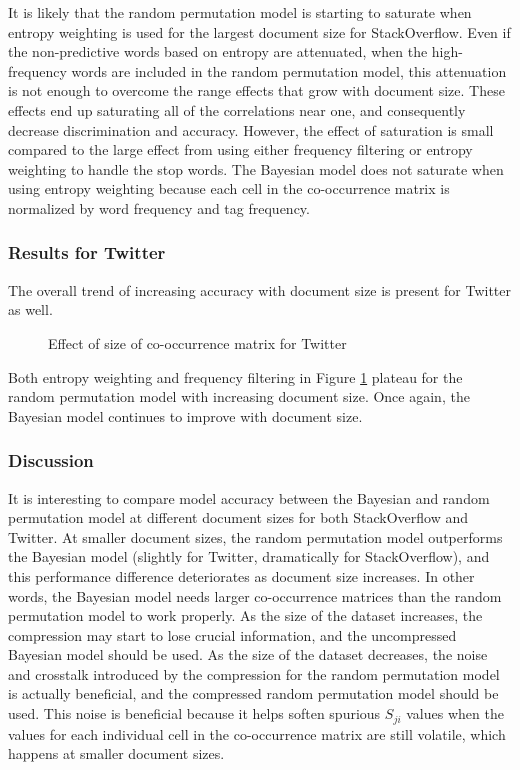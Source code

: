 \documentclass[man,floatsintext,donotrepeattitle]{apa6}
\begin{document}
It is likely that the random permutation model is starting to saturate when entropy weighting is used for the largest document size for StackOverflow.
Even if the non-predictive words based on entropy are attenuated,
when the high-frequency words are included in the random permutation model,
this attenuation is not enough to overcome the range effects that grow with document size.
These effects end up saturating all of the correlations near one, and consequently decrease discrimination and accuracy.
However, the effect of saturation is small compared to the large effect from using either frequency filtering or entropy weighting to handle the stop words.
The Bayesian model does not saturate when using entropy weighting because each cell in the co-occurrence matrix is normalized by word frequency and tag frequency.

\subsubsection{Results for Twitter}

The overall trend of increasing accuracy with document size is present for Twitter as well.

\begin{figure}[!htbp]
  \caption{Effect of size of co-occurrence matrix for Twitter}
  \label{figContextDocumentSizeT}
\end{figure}

Both entropy weighting and frequency filtering in Figure \ref{figContextDocumentSizeT} plateau for the random permutation model with increasing document size.
Once again, the Bayesian model continues to improve with document size.

\subsubsection{Discussion}

It is interesting to compare model accuracy between the Bayesian and random permutation model at different document sizes for both StackOverflow and Twitter.
At smaller document sizes, the random permutation model outperforms the Bayesian model (slightly for Twitter, dramatically for StackOverflow), and this performance difference deteriorates as document size increases.
In other words, the Bayesian model needs larger co-occurrence matrices than the random permutation model to work properly.
As the size of the dataset increases, the compression may start to lose crucial information, and the uncompressed Bayesian model should be used.
As the size of the dataset decreases, the noise and crosstalk introduced by the compression for the random permutation model is actually beneficial, and the compressed random permutation model should be used. 
This noise is beneficial because it helps soften spurious $S_{ji}$ values when the values for each individual cell in the co-occurrence matrix are still volatile, which happens at smaller document sizes.
\end{document}

